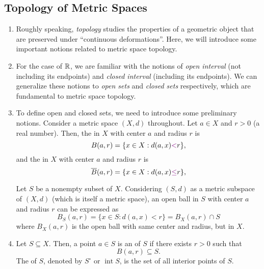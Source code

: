 \subsection{Topology of Metric Spaces}
\label{subsect:metric-spaces-topo}
\begin{enumerate}
\item Roughly speaking, \emph{topology} studies the properties of a geometric
object that are preserved under ``continuous deformations''. Here, we will
introduce some important notions related to metric space topology.

\item For the case of \(\mathbb{R}\), we are familiar with the notions of \emph{open
interval} (not including its endpoints) and \emph{closed interval} (including
its endpoints). We can generalize these notions to \emph{open sets} and
\emph{closed sets} respectively, which are fundamental to metric space
topology.

\item To define open and closed sets, we need to introduce some preliminary
notions. Consider a metric space \((X,d)\) throughout. Let \(a\in X\) and
\(r>0\) (a real number). Then, the  in \(X\) with center \(a\)
and radius \(r\) is
\[
B(a,r)=\{x\in X: d(a,x){\color{violet}<}r\},
\]
and the  in \(X\) with center \(a\) and radius \(r\) is
\[
\overline{B}(a,r)=\{x\in X: d(a,x){\color{violet}\le}r\},
\]
\begin{center}
\end{center}
\begin{note}
Let \(S\) be a nonempty subset of \(X\).  Considering \((S,d)\) as a metric
subspace of \((X,d)\) (which is itself a metric space), an open ball in \(S\)
with center \(a\) and radius \(r\) can be expressed as
\[
B_{S}(a,r)=\{x\in S:d(a,x)<r\}=B_{X}(a,r)\cap S
\]
where \(B_X(a,r)\) is the open ball with same center and radius, but in \(X\).
\end{note}
\item Let \(S\subseteq X\). Then, a point \(a\in S\) is an  of \(S\) if there exists \(r>0\) such that \[
B(a,r)\subseteq S.
\]
The  of \(S\), denoted by \(S^{\circ}\) or
\(\operatorname{int}S\), is the set of all interior points of \(S\).


\end{enumerate}
